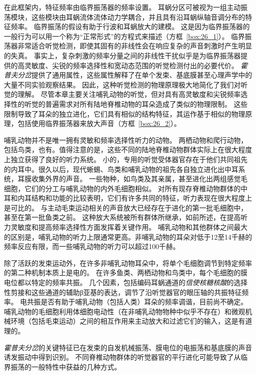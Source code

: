 在此框架内，特征频率由临界振荡器的频率设置。
耳蜗分区可被视为一组主动振荡模块，这些模块由耳蜗流体流体动力学耦合，并且具有沿耳蜗纵轴音调分布的特征频率。
临界振荡的假设有助于行波和耳蜗放大的建模。
这是因为临界振荡器的一般行为可以用一个称为“正常形式”的方程式来描述（方框~\ref{box:26_1}）。
临界振荡器非常适合听觉检测，即使其固有的非线性会在响应复杂的声音刺激时产生明显的失真。
事实上，复杂刺激的频率分量之间的非线性干扰似乎是为临界振荡器提供的高灵敏度、尖锐的频率选择性和宽动态范围的听觉检测付出的必要代价。
\textit{霍普夫分岔}提供了通用属性，这些属性解释了在单个发束、基底膜甚至心理声学中的大量不同实验观察结果。
因此，这种听觉检测的物理原理极大地简化了我们对听觉的理解。
尽管本章主要关注哺乳动物的听觉，但对具有高灵敏度和尖锐频率选择性的听觉的普遍需求对所有陆地脊椎动物的耳朵造成了类似的物理限制。
这些限制导致了耳朵的独立进化，它们具有相似的结构特征，其运作基于相似的物理原理，包括使用临界振荡器来放大声音（方框~\ref{box:26_2}）。


\begin{proposition}[听觉的进化史导致了群体之间的相似性] \label{box:26_2}
	
	\quad \quad 哺乳动物并不是唯一拥有灵敏和频率选择性听力的动物。
	两栖动物和爬行动物，包括鸟类，也有。值得注意的是，这些不同的陆地脊椎动物群体实际上在很大程度上独立获得了良好的听力系统。
	小的，专用的听觉受体器官存在于他们共同祖先的内耳中。很久以后，现代蜥蜴、鸟类和哺乳动物的祖先各自独立进化出中耳系统，耳膜收集外界的声音。
	一些物种，如鸟类及其亲属，甚至进化出两组感觉毛细胞，它们的分工与哺乳动物的内外毛细胞相似。
	对所有现存脊椎动物群体的中耳和内耳结构和功能的比较表明，它们有许多共同的特征，听力表现在很大程度上是可比的。
	与主动毛束运动相关的声音放大已经存在于进化的第一批毛细胞中，甚至在第一批鱼类之前。
	这种放大系统被所有群体所继承，如前所述，在提高听力灵敏度和提高频率选择性方面发挥着关键作用。
	哺乳动物和其他群体之间最大的区别是，哺乳动物的听力上限通常更高。非哺乳动物的耳朵对低于12至14千赫的频率反应有限，而一些哺乳动物的听力可以超过100千赫。
	
	\quad \quad 除了活跃的发束运动外，在许多非哺乳动物耳朵中，将单个毛细胞调节到特定频率的第二种机制本质上是电的。
	在许多鱼类、两栖动物和鸟类中，每个毛细胞的膜电位都以特定的频率共振。
	几个因素，包括编码耳蜗通道的\textit{信使核糖核酸}的选择性剪接和这些通道的辅助β亚基的表达，调节了沿听觉器官的眼压轴的共振特征频率。
	电共振是否有助于哺乳动物（包括人类）耳朵的频率调谐，目前尚不确定。
	哺乳动物的毛细胞利用体细胞电动性（在非哺乳动物物种中似乎不存在）和微观机械环境（包括毛束运动）之间的相互作用来主动放大和过滤它们的输入，这是有道理的。
	
	\quad \quad \textit{霍普夫分岔}的关键特征已在发束的自发机械振荡、膜电位的电振荡和基底膜的声音诱发振动中得到识别。
	不同脊椎动物群体的听觉器官的平行进化可能导致了从临界振荡的一般特性中获益的几种方式。
	
\end{proposition}



